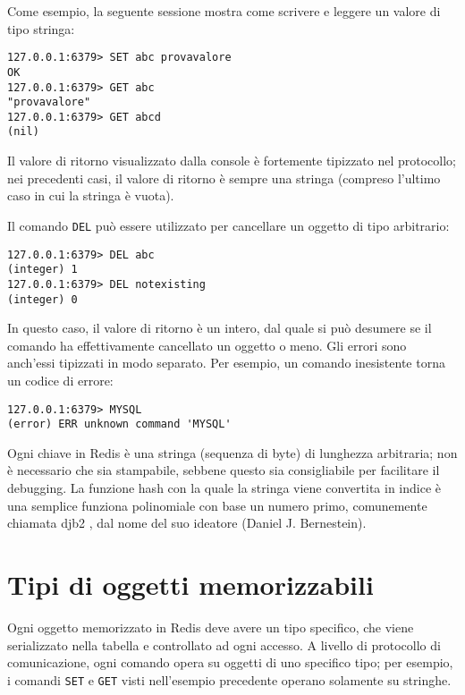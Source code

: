 Come esempio, la seguente sessione mostra come scrivere e leggere un valore di tipo
stringa:

\medskip
\begin{lstlisting}
127.0.0.1:6379> SET abc provavalore
OK
127.0.0.1:6379> GET abc
"provavalore"
127.0.0.1:6379> GET abcd
(nil)
\end{lstlisting}

Il valore di ritorno visualizzato dalla console è fortemente tipizzato nel protocollo;
nei precedenti casi, il valore di ritorno è sempre una stringa (compreso l'ultimo
caso in cui la stringa è vuota).

Il comando \verb|DEL| può essere utilizzato per cancellare un oggetto di tipo
arbitrario:

\medskip
\begin{lstlisting}
127.0.0.1:6379> DEL abc
(integer) 1
127.0.0.1:6379> DEL notexisting
(integer) 0
\end{lstlisting}

In questo caso, il valore di ritorno è un intero, dal quale si può desumere se il comando
ha effettivamente cancellato un oggetto o meno. Gli errori sono anch'essi tipizzati in
modo separato. Per esempio, un comando inesistente torna un codice di errore:

\medskip
\begin{lstlisting}
127.0.0.1:6379> MYSQL
(error) ERR unknown command 'MYSQL'
\end{lstlisting}

Ogni chiave in Redis è una stringa (sequenza di byte) di lunghezza arbitraria; non è
necessario che sia stampabile, sebbene questo sia consigliabile per facilitare il
debugging. La funzione hash con la quale la stringa viene convertita in indice è
una semplice funziona polinomiale con base un numero primo, comunemente chiamata
djb2 \cite{djbhash}, dal nome del suo ideatore (Daniel J. Bernestein).

\section{Tipi di oggetti memorizzabili}

Ogni oggetto memorizzato in Redis deve avere un tipo specifico, che viene serializzato
nella tabella e controllato ad ogni accesso. A livello di protocollo di comunicazione,
ogni comando opera su oggetti di uno specifico tipo; per esempio, i comandi \verb|SET|
e \verb|GET| visti nell'esempio precedente operano solamente su stringhe.

